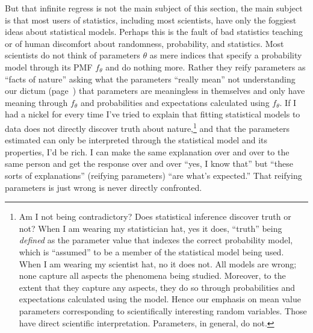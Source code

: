 \documentclass[11pt]{article}
\begin{document}
But that infinite regress is not the main subject of this section, the main
subject is that most users of statistics, including most scientists, have only
the foggiest ideas about statistical models.  Perhaps this is the fault of
bad statistics teaching or of human discomfort about
randomness, probability, and statistics.  Most scientists do not think of
parameters $\theta$ as mere indices that specify a probability model through
its PMF $f_\theta$ and do nothing more.  Rather they reify parameters as
``facts of nature'' asking what the parameters ``really mean'' not
understanding our dictum (page~\pageref{pg:meaningless}) that parameters are
meaningless in themselves and only have meaning through $f_\theta$ and
probabilities and expectations calculated using $f_\theta$.  If I had a nickel
for every time I've tried to explain that fitting statistical models to data
does not directly discover truth about nature,\footnote{Am I not being
contradictory?  Does statistical inference discover truth or not?  When I
am wearing my statistician hat, yes it does, ``truth'' being \emph{defined}
as the parameter value that indexes the correct probability model,
which is ``assumed'' to be a member of the statistical model being used.
When I am wearing my scientist hat, no it does not.  All models are wrong;
none capture all aspects the phenomena being studied.  Moreover, to the
extent that they capture any aspects, they do so through probabilities and
expectations calculated using the model.  Hence our emphasis on mean value
parameters corresponding to scientifically interesting random variables.  Those
have direct scientific interpretation.  Parameters, in general, do not.}
and that the parameters
estimated can only be interpreted through the statistical model and its
properties, I'd be rich.  I can make the same explanation over and over to
the same person and get the response over and over ``yes, I know that''
but ``these sorts of explanations'' (reifying parameters)
``are what's expected.''  That reifying parameters is just wrong
is never directly confronted.
\end{document}
